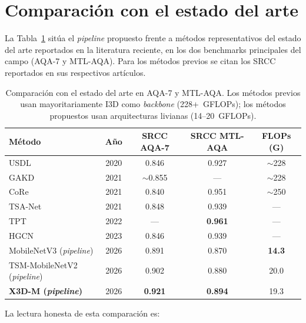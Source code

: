\section{Comparación con el estado del arte}
\label{sec:sota}

La Tabla~\ref{tab:sota} sitúa el \textit{pipeline} propuesto frente a métodos representativos del estado del arte reportados en la literatura reciente, en los dos benchmarks principales del campo (AQA-7 y MTL-AQA). Para los métodos previos se citan los \ac{SRCC} reportados en sus respectivos artículos.

\begin{table}[H]
\centering
\caption{Comparación con el estado del arte en AQA-7 y MTL-AQA. Los métodos previos usan mayoritariamente \ac{I3D} como \textit{backbone} (228+~GFLOPs); los métodos propuestos usan arquitecturas livianas (14--20~GFLOPs).}
\label{tab:sota}
\small
\begin{tabular}{lcccc}
\toprule
\textbf{Método} & \textbf{Año} & \textbf{SRCC AQA-7} & \textbf{SRCC MTL-AQA} & \textbf{FLOPs (G)} \\
\midrule
USDL \cite{Hinton2015Distilling}   & 2020 & 0.846 & 0.927 & $\sim$228 \\
GAKD \cite{Yu2021GroupAware}       & 2021 & $\sim$0.855 & --- & $\sim$228 \\
CoRe \cite{Yu2021GroupAware}       & 2021 & 0.840 & 0.951 & $\sim$250 \\
TSA-Net                            & 2021 & 0.848 & 0.939 & --- \\
TPT                                & 2022 & ---   & \textbf{0.961} & --- \\
HGCN                               & 2023 & 0.846 & 0.939 & --- \\
\midrule
MobileNetV3 (\textit{pipeline})     & 2026 & 0.891          & 0.870          & \textbf{14.3} \\
TSM-MobileNetV2 (\textit{pipeline}) & 2026 & 0.902          & 0.880          & 20.0 \\
\textbf{X3D-M (\textit{pipeline})}  & 2026 & \textbf{0.921} & \textbf{0.894} & 19.3 \\
\bottomrule
\end{tabular}
\end{table}

La lectura honesta de esta comparación es:


